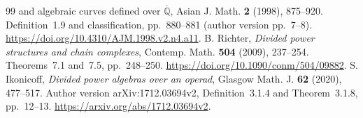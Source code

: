 \documentclass[11pt,a4paper]{article}
\theoremstyle{definition}
\newcommand{\Q}{\mathbb Q}
\begin{document}
\begin{thebibliography}{99}
{and algebraic curves defined over $\overline{\Q}$}, Asian J. Math.
\textbf{2} (1998), 875--920. Definition~1.9 and classification,
pp.~880--881 (author version pp.~7--8).
\url{https://doi.org/10.4310/AJM.1998.v2.n4.a11}.
 B. Richter, \emph{Divided power structures and chain
complexes}, Contemp. Math. \textbf{504} (2009), 237--254.
Theorems~7.1 and~7.5, pp.~248--250.
\url{https://doi.org/10.1090/conm/504/09882}.
 S. Ikonicoff, \emph{Divided power algebras over an
operad}, Glasgow Math. J. \textbf{62} (2020), 477--517.
Author version arXiv:1712.03694v2, Definition~3.1.4 and
Theorem~3.1.8, pp.~12--13.
\url{https://arxiv.org/abs/1712.03694v2}.
\end{thebibliography}
\end{document}
